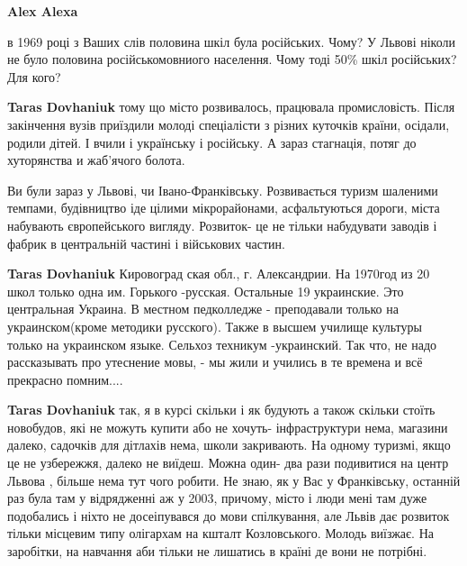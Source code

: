 \begin{itemize}
\begin{itemize}
\textbf{Alex Alexa} 

в 1969 році з Ваших слів половина шкіл була російських. Чому? У Львові ніколи
не було половина російськомовниого населення. Чому тоді 50\% шкіл російських?
Для кого?


 
\textbf{Taras Dovhaniuk} тому що місто розвивалось, працювала промисловість.
Після закінчення вузів приїздили молоді спеціалісти з різних куточків країни,
осідали, родили дітей. І вчили і українську і російську. А зараз стагнація,
потяг до хуторянства и жаб'ячого болота.

 

Ви були зараз у Львові, чи Івано-Франківську. Розвивається туризм шаленими
темпами, будівництво іде цілими мікрорайонами, асфальтуються дороги, міста
набувають європейського вигляду. Розвиток- це не тільки набудувати заводів і
фабрик в центральній частині і військових частин.



\textbf{Taras Dovhaniuk} Кировоград ская обл., г. Александрии. На 1970год из 20
школ только одна им. Горького -русская. Остальные 19 украинские. Это
центральная Украина. В местном педколледже - преподавали только на
украинском(кроме методики русского). Также в высшем училище культуры только на
украинском языке. Сельхоз техникум -украинский. Так что, не надо рассказывать
про утеснение мовы, - мы жили и учились в те времена и всё прекрасно помним....

 
\textbf{Taras Dovhaniuk} так, я в курсі скільки і як будують а також скільки
стоїть новобудов, які не можуть купити або не хочуть- інфраструктури нема,
магазини далеко, садочків для дітлахів нема, школи закривають. На одному
туризмі, якщо це не узбережжя, далеко не виїдеш. Можна один- два рази
подивитися на центр Львова , більше нема тут чого робити. Не знаю, як у Вас у
Франківську, останній раз була там у відрядженні аж у 2003, причому, місто і
люди мені там дуже подобались і ніхто не досеіпувався до мови спілкування, але
Львів дає розвиток тільки місцевим типу олігархам на кшталт Козловського.
Молодь виїзжає. На заробітки, на навчання аби тільки не лишатись в країні де
вони не потрібні.


\end{itemize}
\end{itemize}
